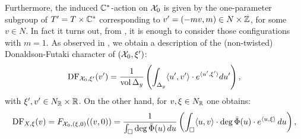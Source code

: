 Furthermore, the induced \(\mathbb{C}^*\)-action on \({\mathcal{X}}_0\) is given by the one-parameter subgroup of 
 \(T' = T \times \mathbb{C}^*\) corresponding to \(v'=(-mv,m) \in N \times \mathbb{Z}\), for some \(v \in N\). In fact it turns out, from \cite{ilten2015}, it is enough to consider those configurations with \(m=1\). As observed in \cite{ilten2015}, we obtain a description of the (non-twisted) Donaldson-Futaki character of $({\mathcal{X}}_0,\xi')$:
\begin{equation}
\mathop{\rm DF}\nolimits_{{\mathcal{X}}_0, \xi'}(v') = \frac{1}{\mathop{\rm vol}\nolimits \Delta_y}\left(\int_{\Delta_y} \langle u', v' \rangle \cdot e^{\langle u', \xi'\rangle} du'\right),\label{eq:futaki-character}
\end{equation}
with $\xi',v' \in N_{\mathbb{R}} \times \mathbb{R}$. On the other hand, for $v,\xi \in N_{\mathbb{R}}$ one obtains:
\begin{equation}
\mathop{\rm DF}\nolimits_{X, \xi}(v) = F_{{\mathcal{X}}_0, (\xi,0)}((v,0))
= \frac{1}{\int_\Box \deg \bar \Phi(u) \,du }\left(\int_{\Box} \langle u, v \rangle \cdot \deg \bar \Phi(u) \cdot e^{\langle u, \xi \rangle}\, du\right)
, \label{eq:futaki-general-fibre}
\end{equation}